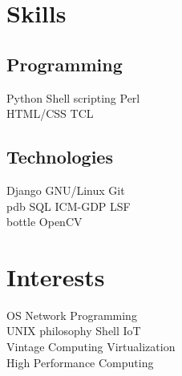\documentclass[]{resume_karuvally_openfont}
\begin{document}
\begin{minipage}[t]{0.33\textwidth}
\section{Skills}
\subsection{Programming}
Python \textbullet{} Shell scripting \textbullet{} Perl \\
HTML/CSS \textbullet{} TCL
\sectionsep

\subsection{Technologies}
Django \textbullet{} GNU/Linux \textbullet{} Git \\
pdb \textbullet{} SQL \textbullet{} ICM-GDP \textbullet{} LSF \\
bottle \textbullet{} OpenCV
\sectionsep


\section{Interests}
OS \textbullet{} Network Programming \\
UNIX philosophy \textbullet{} Shell IoT \\
Vintage Computing \textbullet{} Virtualization \\
High Performance Computing
\sectionsep

%
%

\end{minipage} 
\hfill
\end{document}
